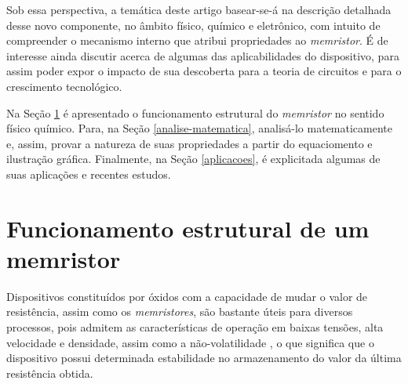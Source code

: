 \documentclass{ceel}
\begin{document}
\begin{multicols}{2}

Sob essa perspectiva, a temática deste artigo basear-se-á na descrição detalhada desse novo componente, no âmbito físico, químico e eletrônico, com intuito de compreender o mecanismo interno que atribui propriedades ao \emph{memristor}. É de interesse ainda discutir acerca de algumas das aplicabilidades do dispositivo, para assim poder expor o impacto de sua descoberta para a teoria de circuitos e para o crescimento tecnológico.

Na Seção \ref{funcionamento-estrutural} é apresentado o funcionamento estrutural do \emph{memristor} no sentido físico químico. Para, na Seção \ref{analise-matematica}, analisá-lo matematicamente e, assim, provar a natureza de suas propriedades a partir do equaciomento e ilustração gráfica. Finalmente, na Seção \ref{aplicacoes}, é explicitada algumas de suas aplicações e recentes estudos.


\section{Funcionamento estrutural de um memristor} \label{funcionamento-estrutural}
Dispositivos constituídos por óxidos com a capacidade de mudar o valor de resistência, %
assim como os \emph{memristores}, são bastante úteis para diversos processos, pois %
admitem as características de operação em baixas tensões, alta velocidade e densidade, %
assim como a não-volatilidade \cite{conceito}, o que significa que o dispositivo possui determinada estabilidade no armazenamento do valor da última resistência obtida. 


\end{multicols}
\end{document}
